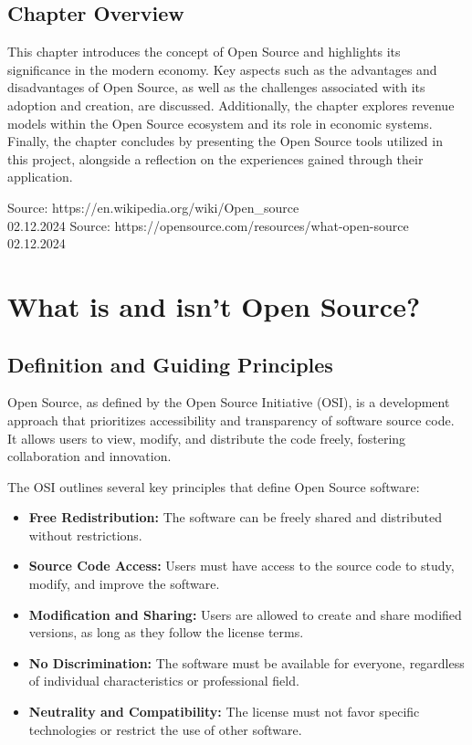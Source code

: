 \subsection{Chapter Overview}

This chapter introduces the concept of Open Source and highlights its significance in the modern economy. 
Key aspects such as the advantages and disadvantages of Open Source, as well as the challenges associated with its adoption and creation, are discussed. 
Additionally, the chapter explores revenue models within the Open Source ecosystem and its role in economic systems. 
Finally, the chapter concludes by presenting the Open Source tools utilized in this project, alongside a reflection on the experiences gained through their application.


Source: https://en.wikipedia.org/wiki/Open_source \\ 02.12.2024
Source: https://opensource.com/resources/what-open-source \\ 02.12.2024

\section{What is and isn’t Open Source?}

\subsection{Definition and Guiding Principles}

Open Source, as defined by the Open Source Initiative (OSI), is a development approach that prioritizes accessibility and transparency of software source code. It allows users to view, modify, and distribute the code freely, fostering collaboration and innovation. 

The OSI outlines several key principles that define Open Source software:

\begin{itemize}
    \item \textbf{Free Redistribution:} The software can be freely shared and distributed without restrictions.
    \item \textbf{Source Code Access:} Users must have access to the source code to study, modify, and improve the software.
    \item \textbf{Modification and Sharing:} Users are allowed to create and share modified versions, as long as they follow the license terms.
    \item \textbf{No Discrimination:} The software must be available for everyone, regardless of individual characteristics or professional field.
    \item \textbf{Neutrality and Compatibility:} The license must not favor specific technologies or restrict the use of other software.
\end{itemize}

